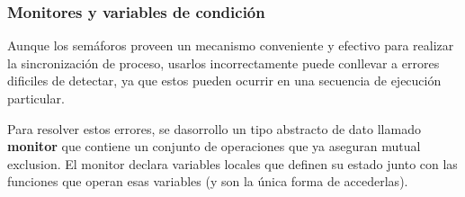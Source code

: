 %
%
%
%
%
%	

\subsubsection{Monitores y variables de condición}
Aunque los semáforos proveen un mecanismo conveniente y efectivo para realizar la sincronización de proceso, usarlos incorrectamente puede conllevar a errores dificiles de detectar, ya que estos pueden ocurrir en una secuencia de ejecución particular.

Para resolver estos errores, se dasorrollo un tipo abstracto de dato llamado \textbf{monitor} que contiene un conjunto de operaciones que ya aseguran mutual exclusion. El monitor declara variables locales que definen su estado junto con las funciones que operan esas variables (y son la única forma de accederlas).

